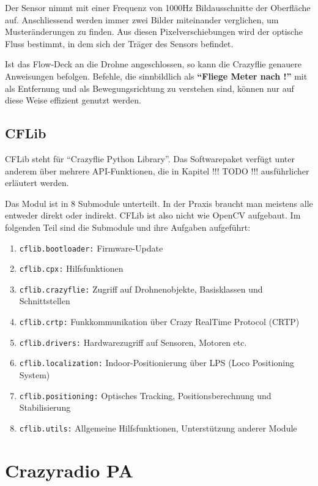 Der  Sensor nimmt mit einer Frequenz von 1000Hz Bildausschnitte der Oberfläche auf.
Anschliessend werden immer zwei Bilder miteinander verglichen, um Musteränderungen zu finden.
Aus diesen Pixelverschiebungen wird der optische Fluss bestimmt, in dem sich der Träger des Sensors befindet. \cite{bc:fdv2_specs}

Ist das Flow-Deck an die Drohne angeschlossen, so kann die Crazyflie genauere Anweisungen befolgen.
Befehle, die sinnbildlich als \textbf{\enquote{Fliege  Meter nach !}} mit  als Entfernung und  als Bewegungsrichtung zu verstehen sind, können nur auf diese Weise effizient genutzt werden.

\subsection{CFLib}
\label{sub:cflib}
CFLib steht für \enquote{Crazyflie Python Library}.
Das Softwarepaket verfügt unter anderem über mehrere API-Funktionen, die in Kapitel !!! TODO !!! ausführlicher erläutert werden.

Das Modul ist in 8 Submodule unterteilt.
In der Praxis braucht man meistens alle entweder direkt oder indirekt.
CFLib ist also nicht wie OpenCV aufgebaut.
Im folgenden Teil sind die Submodule und ihre Aufgaben aufgeführt:

\begin{enumerate}
    \item \texttt{cflib.bootloader:} Firmware-Update
    \item \texttt{cflib.cpx:} Hilfsfunktionen
    \item \texttt{cflib.crazyflie:} Zugriff auf Drohnenobjekte, Basisklassen und Schnittstellen
    \item \texttt{cflib.crtp:} Funkkommunikation über Crazy RealTime Protocol (CRTP)
    \item \texttt{cflib.drivers:} Hardwarezugriff auf Sensoren, Motoren etc.
    \item \texttt{cflib.localization:} Indoor-Positionierung über LPS (Loco Positioning System)
    \item \texttt{cflib.positioning:} Optisches Tracking, Positionsberechnung und Stabilisierung
    \item \texttt{cflib.utils:} Allgemeine Hilfsfunktionen, Unterstützung anderer Module
\end{enumerate}

\section{Crazyradio PA}
\label{sec:crpa}

